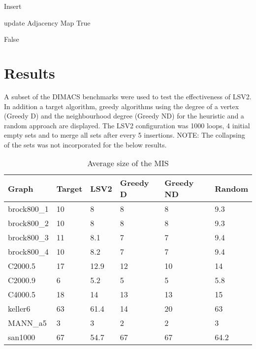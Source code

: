 \documentclass[conference]{IEEEtran}
\begin{document}
  \begin{algorithm}[H]
 \caption{Insert}
 \begin{algorithmic}[1]
 \renewcommand{\algorithmicrequire}{\textbf{Input:}}
 \renewcommand{\algorithmicensure}{\textbf{Output:}}

            \STATE update Adjacency Map
            \RETURN True
        \ENDIF
    \ENDFOR

    \RETURN False


 \end{algorithmic} 
\end{algorithm}


\section{Results}

A subset of the DIMACS benchmarks were used to test the effectiveness of LSV2. In addition a target algorithm,
greedy algorithms using the degree of a vertex (Greedy D) and the neighbourhood degree (Greedy ND) for the heuristic and a random approach are displayed.
The LSV2 configuration was 1000 loops, 4 initial empty sets and to merge all sets after every 5 insertions.
NOTE: The collapsing of the sets was not incorporated for the below results.

\begin{table}[h]
\caption{Average size of the MIS}
\label{tab:my-table}
\begin{tabular}{|l|l|l|l|l|l|}
\hline
Graph       & Target & LSV2 & Greedy D & Greedy ND & Random \\ \hline
brock800\_1 & 10     & 8    & 8        & 8         & 9.3    \\ \hline
brock800\_2 & 10     & 8    & 8        & 8         & 9.3    \\ \hline
brock800\_3 & 11     & 8.1  & 7        & 7         & 9.4    \\ \hline
brock800\_4 & 10     & 8.2  & 7        & 7         & 9.4    \\ \hline
C2000.5     & 17     & 12.9 & 12       & 10        & 14     \\ \hline
C2000.9     & 6      & 5.2  & 5        & 5         & 5.8    \\ \hline
C4000.5     & 18     & 14   & 13       & 13        & 15     \\ \hline
keller6     & 63     & 61.4 & 14       & 20        & 63     \\ \hline
MANN\_a5    & 3      & 3    & 2        & 2         & 3      \\ \hline
san1000     & 67     & 54.7 & 67       & 67        & 64.2   \\ \hline
\end{tabular}
\end{table}
\end{document}
